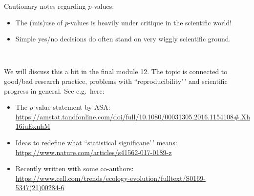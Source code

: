 \documentclass[
  10pt,
  ignorenonframetext,
]{beamer}
\providecommand{\tightlist}{%
  \setlength{\itemsep}{0pt}\setlength{\parskip}{0pt}}
\begin{document}
\begin{frame}
\begin{block}{Cautionary notes regarding \(p\)-values:}
\protect\hypertarget{cautionary-notes-regarding-p-values}{}
\(~\)

\begin{itemize}
\item
  The (mis)use of \(p\)-values is heavily under critique in the
  scientific world!
\item
  Simple yes/no decisions do often stand on very wiggly scientific
  ground.
\end{itemize}

\vspace{2mm}

\(~\)

\scriptsize

We will discuss this a bit in the final module 12. The topic is
connected to good/bad research practice, problems with
``reproducibility'\,' and scientific progress in general. See e.g.~here:

\begin{itemize}
\tightlist
\item
  The \(p\)-value statement by ASA:
  \url{https://amstat.tandfonline.com/doi/full/10.1080/00031305.2016.1154108\#.Xh16iuExnhM}
\item
  Ideas to redefine what ``statistical significane'\,' means:
  \url{https://www.nature.com/articles/s41562-017-0189-z}
\item
  Recently written with some co-authors:
  \url{https://www.cell.com/trends/ecology-evolution/fulltext/S0169-5347(21)00284-6}
\end{itemize}
\end{block}
\end{frame}
\end{document}
